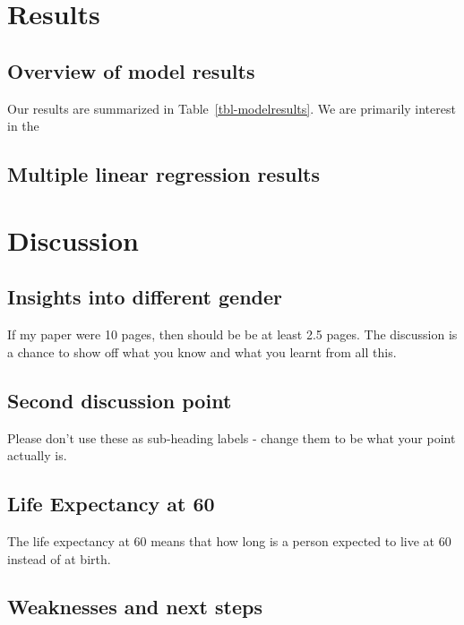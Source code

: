 \documentclass[
  letterpaper,
  DIV=11,
  numbers=noendperiod]{scrartcl}
\begin{document}
\section{Results}\label{results}

\subsection{Overview of model results}\label{overview-of-model-results}

Our results are summarized in Table~\ref{tbl-modelresults}. We are
primarily interest in the

\subsection{Multiple linear regression
results}\label{multiple-linear-regression-results}

\section{Discussion}\label{discussion}

\subsection{Insights into different
gender}\label{insights-into-different-gender}

If my paper were 10 pages, then should be be at least 2.5 pages. The
discussion is a chance to show off what you know and what you learnt
from all this.

\subsection{Second discussion point}\label{second-discussion-point}

Please don't use these as sub-heading labels - change them to be what
your point actually is.

\subsection{Life Expectancy at 60}\label{life-expectancy-at-60}

The life expectancy at 60 means that how long is a person expected to
live at 60 instead of at birth.

\subsection{Weaknesses and next steps}\label{weaknesses-and-next-steps}
\end{document}
